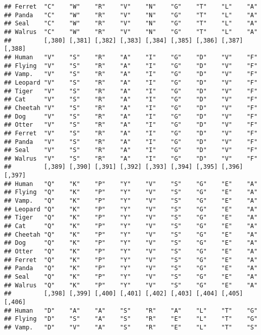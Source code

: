 \documentclass[]{article}
\begin{document}
\begin{verbatim}
## Ferret  "C"    "W"    "R"    "V"    "N"    "G"    "T"    "L"    "A"   
## Panda   "C"    "W"    "R"    "V"    "N"    "G"    "T"    "L"    "A"   
## Seal    "C"    "W"    "R"    "V"    "N"    "G"    "T"    "L"    "A"   
## Walrus  "C"    "W"    "R"    "V"    "N"    "G"    "T"    "L"    "A"   
##         [,380] [,381] [,382] [,383] [,384] [,385] [,386] [,387] [,388]
## Human   "V"    "S"    "R"    "A"    "I"    "G"    "D"    "V"    "F"   
## Flying  "V"    "S"    "R"    "A"    "I"    "G"    "D"    "V"    "F"   
## Vamp.   "V"    "S"    "R"    "A"    "I"    "G"    "D"    "V"    "F"   
## Leopard "V"    "S"    "R"    "A"    "I"    "G"    "D"    "V"    "F"   
## Tiger   "V"    "S"    "R"    "A"    "I"    "G"    "D"    "V"    "F"   
## Cat     "V"    "S"    "R"    "A"    "I"    "G"    "D"    "V"    "F"   
## Cheetah "V"    "S"    "R"    "A"    "I"    "G"    "D"    "V"    "F"   
## Dog     "V"    "S"    "R"    "A"    "I"    "G"    "D"    "V"    "F"   
## Otter   "V"    "S"    "R"    "A"    "I"    "G"    "D"    "V"    "F"   
## Ferret  "V"    "S"    "R"    "A"    "I"    "G"    "D"    "V"    "F"   
## Panda   "V"    "S"    "R"    "A"    "I"    "G"    "D"    "V"    "F"   
## Seal    "V"    "S"    "R"    "A"    "I"    "G"    "D"    "V"    "F"   
## Walrus  "V"    "S"    "R"    "A"    "I"    "G"    "D"    "V"    "F"   
##         [,389] [,390] [,391] [,392] [,393] [,394] [,395] [,396] [,397]
## Human   "Q"    "K"    "P"    "Y"    "V"    "S"    "G"    "E"    "A"   
## Flying  "Q"    "K"    "P"    "Y"    "V"    "S"    "G"    "E"    "A"   
## Vamp.   "Q"    "K"    "P"    "Y"    "V"    "S"    "G"    "E"    "A"   
## Leopard "Q"    "K"    "P"    "Y"    "V"    "S"    "G"    "E"    "A"   
## Tiger   "Q"    "K"    "P"    "Y"    "V"    "S"    "G"    "E"    "A"   
## Cat     "Q"    "K"    "P"    "Y"    "V"    "S"    "G"    "E"    "A"   
## Cheetah "Q"    "K"    "P"    "Y"    "V"    "S"    "G"    "E"    "A"   
## Dog     "Q"    "K"    "P"    "Y"    "V"    "S"    "G"    "E"    "A"   
## Otter   "Q"    "K"    "P"    "Y"    "V"    "S"    "G"    "E"    "A"   
## Ferret  "Q"    "K"    "P"    "Y"    "V"    "S"    "G"    "E"    "A"   
## Panda   "Q"    "K"    "P"    "Y"    "V"    "S"    "G"    "E"    "A"   
## Seal    "Q"    "K"    "P"    "Y"    "V"    "S"    "G"    "E"    "A"   
## Walrus  "Q"    "K"    "P"    "Y"    "V"    "S"    "G"    "E"    "A"   
##         [,398] [,399] [,400] [,401] [,402] [,403] [,404] [,405] [,406]
## Human   "D"    "A"    "A"    "S"    "R"    "A"    "L"    "T"    "G"   
## Flying  "D"    "S"    "A"    "S"    "R"    "E"    "L"    "T"    "G"   
## Vamp.   "D"    "V"    "A"    "S"    "R"    "E"    "L"    "T"    "S"   

\end{verbatim}
\end{document}
